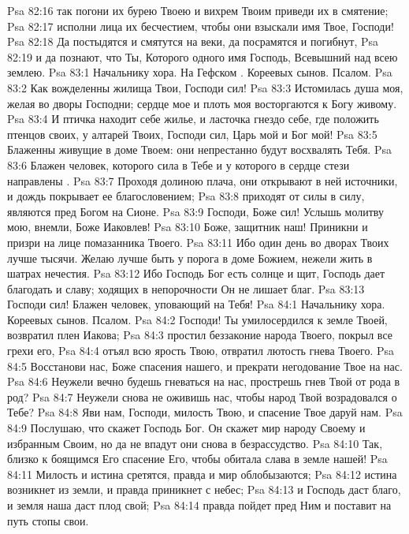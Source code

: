 \vs Psa 82:16 так погони их бурею Твоею и вихрем Твоим приведи их в смятение;
\vs Psa 82:17 исполни лица их бесчестием, чтобы они взыскали имя Твое, Господи!
\vs Psa 82:18 Да постыдятся и смятутся на веки, да посрамятся и погибнут,
\vs Psa 82:19 и да познают, что Ты, Которого одного имя Господь, Всевышний над всею землею.
\vs Psa 83:1 Начальнику хора. На Гефском . Кореевых сынов. Псалом.
\rsbpar\vs Psa 83:2 Как вожделенны жилища Твои, Господи сил!
\vs Psa 83:3 Истомилась душа моя, желая во дворы Господни; сердце мое и плоть моя восторгаются к Богу живому.
\vs Psa 83:4 И птичка находит себе жилье, и ласточка гнездо себе, где положить птенцов своих, у алтарей Твоих, Господи сил, Царь мой и Бог мой!
\vs Psa 83:5 Блаженны живущие в доме Твоем: они непрестанно будут восхвалять Тебя.
\vs Psa 83:6 Блажен человек, которого сила в Тебе и у которого в сердце стези направлены .
\vs Psa 83:7 Проходя долиною плача, они открывают в ней источники, и дождь покрывает ее благословением;
\vs Psa 83:8 приходят от силы в силу, являются пред Богом на Сионе.
\vs Psa 83:9 Господи, Боже сил! Услышь молитву мою, внемли, Боже Иаковлев!
\vs Psa 83:10 Боже, защитник наш! Приникни и призри на лице помазанника Твоего.
\vs Psa 83:11 Ибо один день во дворах Твоих лучше тысячи. Желаю лучше быть у порога в доме Божием, нежели жить в шатрах нечестия.
\vs Psa 83:12 Ибо Господь Бог есть солнце и щит, Господь дает благодать и славу; ходящих в непорочности Он не лишает благ.
\vs Psa 83:13 Господи сил! Блажен человек, уповающий на Тебя!
\vs Psa 84:1 Начальнику хора. Кореевых сынов. Псалом.
\rsbpar\vs Psa 84:2 Господи! Ты умилосердился к земле Твоей, возвратил плен Иакова;
\vs Psa 84:3 простил беззаконие народа Твоего, покрыл все грехи его,
\vs Psa 84:4 отъял всю ярость Твою, отвратил лютость гнева Твоего.
\vs Psa 84:5 Восстанови нас, Боже спасения нашего, и прекрати негодование Твое на нас.
\vs Psa 84:6 Неужели вечно будешь гневаться на нас, прострешь гнев Твой от рода в род?
\vs Psa 84:7 Неужели снова не оживишь нас, чтобы народ Твой возрадовался о Тебе?
\vs Psa 84:8 Яви нам, Господи, милость Твою, и спасение Твое даруй нам.
\vs Psa 84:9 Послушаю, что скажет Господь Бог. Он скажет мир народу Своему и избранным Своим, но да не впадут они снова в безрассудство.
\vs Psa 84:10 Так, близко к боящимся Его спасение Его, чтобы обитала слава в земле нашей!
\vs Psa 84:11 Милость и истина сретятся, правда и мир облобызаются;
\vs Psa 84:12 истина возникнет из земли, и правда приникнет с небес;
\vs Psa 84:13 и Господь даст благо, и земля наша даст плод свой;
\vs Psa 84:14 правда пойдет пред Ним и поставит на путь стопы свои.
